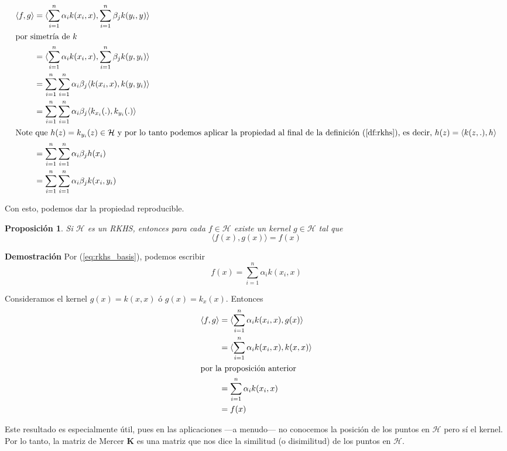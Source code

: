 \documentclass{article}
\numberwithin{equation}{section}
\newtheorem{proposition}{Proposición}
\theoremstyle{remark}
\theoremstyle{definition}
\theoremstyle{remark}
\theoremstyle{remark}
\begin{document}
\begin{align*}
    \langle f, g \rangle &= \langle \sum_{i=1}^n \alpha_i k(x_i, x), \sum_{i=1}^n \beta_j k(y_i, y) \rangle \\
        \intertext{por simetría de $k$}
        &= \langle \sum_{i=1}^n \alpha_i k(x_i, x), \sum_{i=1}^n \beta_j k(y, y_i) \rangle \\
        &= \sum_{i=1}^n  \sum_{i=1}^n \alpha_i \beta_j \langle k(x_i, x),  k(y, y_i) \rangle \\
        &= \sum_{i=1}^n  \sum_{i=1}^n \alpha_i \beta_j \langle k_{x_i}(.),  k_{y_i}(.) \rangle \\
        \intertext{Note que $h(z) = k_{y_i}(z) \in \mathcal{H}$ y por lo tanto podemos aplicar la propiedad al final de la 
definición (\ref{df:rkhs}), es decir, $h(z) = \langle k(z, .), h \rangle$}
        &= \sum_{i=1}^n  \sum_{i=1}^n \alpha_i \beta_j h(x_i) \\
        &= \sum_{i=1}^n  \sum_{i=1}^n \alpha_i \beta_j k(x_i, y_i) 
\end{align*}

Con esto, podemos dar la propiedad reproducible.

\begin{proposition}
    \label{pp:reproducing_property}
    Si $\mathcal{H}$ es un RKHS, entonces para cada $f \in \mathcal{H}$ 
    existe un kernel $g \in \mathcal{H}$ tal que
    $$\langle f(x), g(x) \rangle = f(x)$$
\end{proposition}

\textbf{Demostración}
Por (\ref{eq:rkhs_basis}), podemos escribir
$$f(x) = \sum_{i=1}^n \alpha_i k(x_i, x)$$

Consideramos el kernel $g(x) = k(x, x)$ ó $g(x) = k_x(x)$.
Entonces
\begin{align*}
\langle f, g \rangle &= \langle \sum_{i=1}^n \alpha_i k(x_i, x), g(x) \rangle \\
        &= \langle \sum_{i=1}^n \alpha_i k(x_i, x), k(x, x) \rangle \\
        \intertext{por la proposición anterior}
        &= \sum_{i=1}^n \alpha_i  k(x_i, x) \\
        &= f(x)
\end{align*}

Este resultado es especialmente útil, pues en las aplicaciones ---a menudo--- no conocemos 
la posición de los puntos en $\mathcal{H}$ pero sí el kernel. Por lo tanto, la matriz de Mercer
$\bm{K}$ es una matriz que nos dice la similitud (o disimilitud) de los puntos en $\mathcal{H}$.
\end{document}
